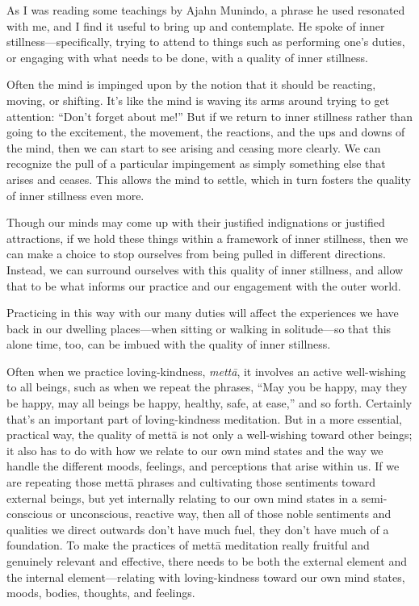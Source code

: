
As I was reading some teachings by Ajahn Munindo, a phrase he used 
resonated with me, and I find it useful to bring up and contemplate. He 
spoke of inner stillness---specifically, trying to attend to things 
such as performing one's duties, or engaging with what needs to be 
done, with a quality of inner stillness.

Often the mind is impinged upon by the notion that it should be 
reacting, moving, or shifting. It's like the mind is waving its arms 
around trying to get attention: ``Don't forget about me!'' But if we 
return to inner stillness rather than going to the excitement, the 
movement, the reactions, and the ups and downs of the mind, then we can 
start to see arising and ceasing more clearly. We can recognize the 
pull of a particular impingement as simply something else that arises 
and ceases. This allows the mind to settle, which in turn fosters the 
quality of inner stillness even more.

Though our minds may come up with their justified indignations or 
justified attractions, if we hold these things within a framework of 
inner stillness, then we can make a choice to stop ourselves from being 
pulled in different directions. Instead, we can surround ourselves with 
this quality of inner stillness, and allow that to be what informs our 
practice and our engagement with the outer world.

Practicing in this way with our many duties will affect the experiences 
we have back in our dwelling places---when sitting or walking in 
solitude---so that this alone time, too, can be imbued with the quality 
of inner stillness.


Often when we practice loving-kindness, \emph{mettā}, it involves an 
active well-wishing to all beings, such as when we repeat the phrases, 
``May you be happy, may they be happy, may all beings be happy, 
healthy, safe, at ease,'' and so forth. Certainly that's an important 
part of loving-kindness meditation. But in a more essential, practical 
way, the quality of mettā is not only a well-wishing toward other 
beings; it also has to do with how we relate to our own mind states and 
the way we handle the different moods, feelings, and perceptions that 
arise within us. If we are repeating those mettā phrases and 
cultivating those sentiments toward external beings, but yet internally 
relating to our own mind states in a semi-conscious or unconscious, 
reactive way, then all of those noble sentiments and qualities we 
direct outwards don't have much fuel, they don't have much of a 
foundation. To make the practices of mettā meditation really fruitful 
and genuinely relevant and effective, there needs to be both the 
external element and the internal element---relating with 
loving-kindness toward our own mind states, moods, bodies, thoughts, 
and feelings.

